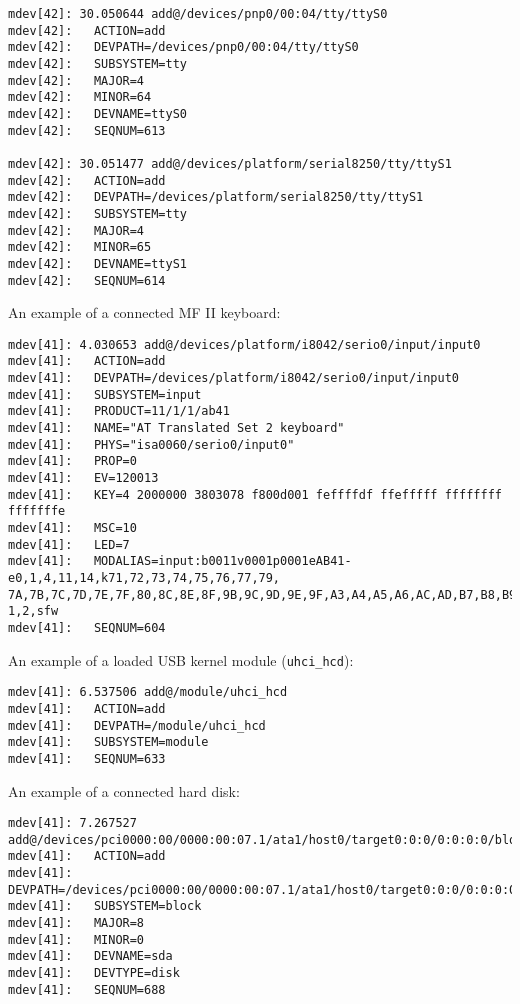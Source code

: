 \begin{scriptsize}
\begin{verbatim}
mdev[42]: 30.050644 add@/devices/pnp0/00:04/tty/ttyS0
mdev[42]:   ACTION=add
mdev[42]:   DEVPATH=/devices/pnp0/00:04/tty/ttyS0
mdev[42]:   SUBSYSTEM=tty
mdev[42]:   MAJOR=4
mdev[42]:   MINOR=64
mdev[42]:   DEVNAME=ttyS0
mdev[42]:   SEQNUM=613

mdev[42]: 30.051477 add@/devices/platform/serial8250/tty/ttyS1
mdev[42]:   ACTION=add
mdev[42]:   DEVPATH=/devices/platform/serial8250/tty/ttyS1
mdev[42]:   SUBSYSTEM=tty
mdev[42]:   MAJOR=4
mdev[42]:   MINOR=65
mdev[42]:   DEVNAME=ttyS1
mdev[42]:   SEQNUM=614
\end{verbatim}
\end{scriptsize}

An example of a connected MF II keyboard:

\begin{scriptsize}
\begin{verbatim}
mdev[41]: 4.030653 add@/devices/platform/i8042/serio0/input/input0
mdev[41]:   ACTION=add
mdev[41]:   DEVPATH=/devices/platform/i8042/serio0/input/input0
mdev[41]:   SUBSYSTEM=input
mdev[41]:   PRODUCT=11/1/1/ab41
mdev[41]:   NAME="AT Translated Set 2 keyboard"
mdev[41]:   PHYS="isa0060/serio0/input0"
mdev[41]:   PROP=0
mdev[41]:   EV=120013
mdev[41]:   KEY=4 2000000 3803078 f800d001 feffffdf ffefffff ffffffff fffffffe
mdev[41]:   MSC=10
mdev[41]:   LED=7
mdev[41]:   MODALIAS=input:b0011v0001p0001eAB41-e0,1,4,11,14,k71,72,73,74,75,76,77,79,
7A,7B,7C,7D,7E,7F,80,8C,8E,8F,9B,9C,9D,9E,9F,A3,A4,A5,A6,AC,AD,B7,B8,B9,D9,E2,ram4,l0,
1,2,sfw
mdev[41]:   SEQNUM=604
\end{verbatim}
\end{scriptsize}

An example of a loaded USB kernel module (\texttt{uhci\_hcd}):

\begin{scriptsize}
\begin{verbatim}
mdev[41]: 6.537506 add@/module/uhci_hcd
mdev[41]:   ACTION=add
mdev[41]:   DEVPATH=/module/uhci_hcd
mdev[41]:   SUBSYSTEM=module
mdev[41]:   SEQNUM=633
\end{verbatim}
\end{scriptsize}

An example of a connected hard disk:

\begin{scriptsize}
\begin{verbatim}
mdev[41]: 7.267527 add@/devices/pci0000:00/0000:00:07.1/ata1/host0/target0:0:0/0:0:0:0/block/sda
mdev[41]:   ACTION=add
mdev[41]:   DEVPATH=/devices/pci0000:00/0000:00:07.1/ata1/host0/target0:0:0/0:0:0:0/block/sda
mdev[41]:   SUBSYSTEM=block
mdev[41]:   MAJOR=8
mdev[41]:   MINOR=0
mdev[41]:   DEVNAME=sda
mdev[41]:   DEVTYPE=disk
mdev[41]:   SEQNUM=688
\end{verbatim}
\end{scriptsize}

